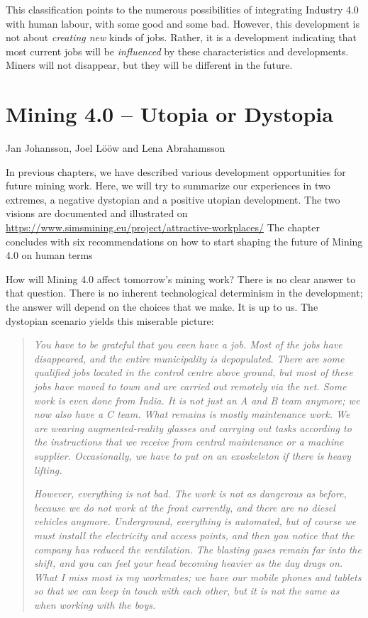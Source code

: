 \documentclass[
  12pt,
]{scrbook}
\newenvironment{chap-auth}
{\vspace{1cm}\begin{center}\begin{flushright}\sffamily\noindent}
  {\end{flushright}\end{center}\vspace{1cm}}
\begin{document}
This classification points to the numerous possibilities of integrating Industry 4.0 with human labour, with some good and some bad. However, this development is not about \emph{creating new} kinds of jobs. Rather, it is a development indicating that most current jobs will be \emph{influenced} by these characteristics and developments. Miners will not disappear, but they will be different in the future.

\hypertarget{mining-4.0-utopia-or-dystopia}{%
\chapter{Mining 4.0 -- Utopia or Dystopia}\label{mining-4.0-utopia-or-dystopia}}

\begin{chap-auth}
Jan Johansson, Joel Lööw and Lena Abrahamsson
\end{chap-auth}

In previous chapters, we have described various development opportunities for future mining work. Here, we will try to summarize our experiences in two extremes, a negative dystopian and a positive utopian development. The two visions are documented and illustrated on \url{https://www.simsmining.eu/project/attractive-workplaces/} The chapter concludes with six recommendations on how to start shaping the future of Mining 4.0 on human terms

How will Mining 4.0 affect tomorrow's mining work? There is no clear answer to that question. There is no inherent technological determinism in the development; the answer will depend on the choices that we make. It is up to us. The dystopian scenario yields this miserable picture:

\begin{quote}
\emph{You have to be grateful that you even have a job. Most of the jobs have disappeared, and the entire municipality is depopulated. There are some qualified jobs located in the control centre above ground, but most of these jobs have moved to town and are carried out remotely via the net. Some work is even done from India. It is not just an A and B team anymore; we now also have a C team. What remains is mostly maintenance work. We are wearing augmented-reality glasses and carrying out tasks according to the instructions that we receive from central maintenance or a machine supplier. Occasionally, we have to put on an exoskeleton} \emph{if there is heavy lifting.}

\emph{However, everything is not bad. The work is not as dangerous as before, because we do not work at the front currently, and there are no diesel vehicles anymore. Underground, everything is automated, but of course we must install the electricity and access points, and then you notice that the company has reduced the ventilation. The blasting gases remain far into the shift, and you can feel your head becoming heavier as the day drags on. What I miss most is my workmates; we have our mobile phones and tablets so that we can keep in touch with each other, but it is not the same as when working with the boys.}
\end{quote}
\end{document}

